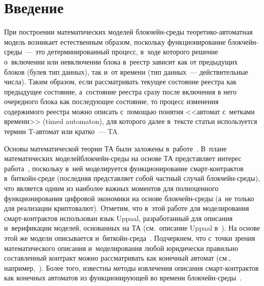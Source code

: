
\thispagestyle{headings}

\begin{multicols}{2}

\label{st\stat}

\section{Введение}

При построении математических моделей\linebreak
 блок\-чейн-сре\-ды тео\-ре\-ти\-ко-ав\-то\-мат\-ная 
модель\linebreak
воз\-ни\-ка\-ет естественным образом, поскольку функ\-ци\-о\-ни\-ро\-ва\-ние 
блок\-чейн-сре\-ды~--- это детерминированный
процесс, в~ходе которого решение 
о~включении или невключении блока в~реестр  зависит как
от предыдущих блоков (булев тип данных), так и~от времени (тип данных~---
действительные чис\-ла). Таким образом,  если рассматривать текущее состояние
реестра как предыдущее состояние, а~состояние реестра сразу после включения
в него очередного блока как последующее состояние, то процесс
изменения содержимого реестра
можно описать с~по\-мощью понятия
<<автомат с~метками времени>> (timed automaton), для которого далее 
в~текс\-те статьи используется термин T-ав\-то\-мат
или кратко~--- TA.

Основы  математической теории ТА были заложены в~работе~\cite{timed-auto}.
В~плане математических моде\-лей\linebreak блок\-чейн-сре\-ды
на основе ТА пред\-став\-ляет\linebreak
интерес работа~\cite{Bitcoin-contract-model}, поскольку в~ней мо\-де\-ли\-ру\-ет\-ся
функционирование смарт-кон\-трак\-тов в~бит\-койн-сре\-де (последняя
пред\-став\-ля\-ет собой част\-ный случай блок\-чейн-сре\-ды), что является одним из наиболее
важных моментов для полноценного функционирования цифровой экономики на основе блок\-чейн-сре\-ды 
(а~не только для  реализации криптовалют). Отметим, что в~этой работе для
моделирования смарт-кон\-трак\-тов использован
язык Uppaal, разработанный  для описания и~верификации моделей, основанных
на ТА (см.\ описание \mbox{Uppaal} в~\cite{Uppaal-tutorial}). На основе этой же модели
описывается и~бит\-койн-сре\-да~\cite{Model-bitcoin-uppaal}. Подчеркнем,
что с~точки зрения математического описания и~моделирования любой юридически
правильно составленный
контракт можно рассматривать как конечный автомат 
(см., например,~\cite{contract-automat}).
Более того, известны
методы извлечения описания смарт-контрактов как конечных автоматов из функционирующей
во времени
блок\-чейн-среды~\cite{mining-smart-contract}.


\end{multicols}
